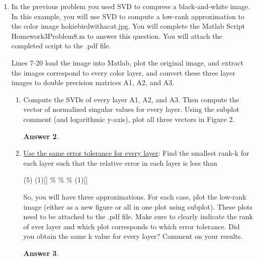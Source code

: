 \documentclass{article}
\theoremstyle{definition}
\newtheorem*{answer}{Answer}
\begin{document}
\begin{enumerate}[leftmargin=\labelsep]
\begin{enumerate}
\begin{answer}
\begin{figure}[H]
\begin{subfigure}{0.225\textwidth}
					            \caption{\(k=50\)}\label{fig:Thumb50}
				            \end{subfigure}
				            \caption{Original fingerprint image compared to its optimal rank-\(k \) approximations.}\label{fig:Thums}
			            \end{figure}
						The code is given below:
			            \begin{mdframed}[backgroundcolor=lightgray] 
			            \end{mdframed}
						
		            \end{answer}
	      \end{enumerate}

	\item In the previous problem you used SVD to compress a black-and-white image. In this example, you will use SVD to compute a low-rank approximation to the color image hokiebirdwithacat.jpg. You will complete the Matlab Script Homework3Problem8.m to answer this question. You will attach the completed script to the .pdf file.

	      Lines 7-20 load the image into Matlab, plot the original image, and extract the images correspond to every color layer, and convert these three layer images to double precision matrices A1, A2, and A3.
	      \begin{enumerate}
		      \item Compute the SVDs of every layer A1, A2, and A3. Then compute the vector of normalized singular values for every layer. Using the subplot comment (and logarithmic y-axis), plot all three vectors in Figure 2.
		            \begin{answer}

		            \end{answer}

		      \item \underline{Use the same error tolerance for every layer}: Find the smallest rank-k for each layer such that the relative error in each layer is less than

		            \begin{tasks}[label = {(\roman*)}, label-width = 1.75em, label-offset = 0em](5)
			            \task*(1)[]
			            \%
			            \%
			            \%
			            \task*(1)[]
		            \end{tasks}

		            So, you will have three approximations. For each case, plot the low-rank image (either as a new figure or all in one plot using subplot). These plots need to be attached to the .pdf file. Make sure to clearly indicate the rank of ever layer and which plot corresponds to which error tolerance. Did you obtain the same k value for every layer? Comment on your results.
		            \begin{answer}


\end{answer}
\end{enumerate}
\end{enumerate}
\end{document}
